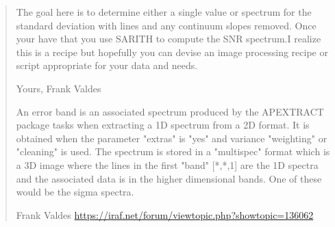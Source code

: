 \begin{quote}
The goal here is to determine either a single value or spectrum for
the standard deviation with lines and any continuum slopes
removed. Once your have that you use SARITH to compute the SNR
spectrum.I realize this is a recipe but hopefully you can devise an
image processing recipe or script appropriate for your data and
needs.

Yours, Frank Valdes 

An error \gls{band} is an associated spectrum produced by the APEXTRACT
package tasks when extracting a 1D spectrum from a 2D format. It is
obtained when the parameter "extras" is "yes" and variance "weighting"
or "cleaning" is used. The spectrum is stored in a "multispec" format
which is a 3D image where the lines in the first "band" [*,*,1] are
the 1D spectra and the associated data is in the higher dimensional
bands. One of these would be the sigma spectra.

Frank Valdes \url{https://iraf.net/forum/viewtopic.php?showtopic=136062}
\end{quote}
